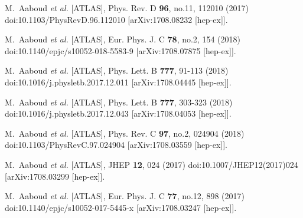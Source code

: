 \begin{thebibliography}{9}
M.~Aaboud \textit{et al.} [ATLAS],
Phys. Rev. D \textbf{96}, no.11, 112010 (2017)
doi:10.1103/PhysRevD.96.112010
[arXiv:1708.08232 [hep-ex]].

M.~Aaboud \textit{et al.} [ATLAS],
Eur. Phys. J. C \textbf{78}, no.2, 154 (2018)
doi:10.1140/epjc/s10052-018-5583-9
[arXiv:1708.07875 [hep-ex]].

M.~Aaboud \textit{et al.} [ATLAS],
Phys. Lett. B \textbf{777}, 91-113 (2018)
doi:10.1016/j.physletb.2017.12.011
[arXiv:1708.04445 [hep-ex]].

M.~Aaboud \textit{et al.} [ATLAS],
Phys. Lett. B \textbf{777}, 303-323 (2018)
doi:10.1016/j.physletb.2017.12.043
[arXiv:1708.04053 [hep-ex]].

M.~Aaboud \textit{et al.} [ATLAS],
Phys. Rev. C \textbf{97}, no.2, 024904 (2018)
doi:10.1103/PhysRevC.97.024904
[arXiv:1708.03559 [hep-ex]].

M.~Aaboud \textit{et al.} [ATLAS],
JHEP \textbf{12}, 024 (2017)
doi:10.1007/JHEP12(2017)024
[arXiv:1708.03299 [hep-ex]].

M.~Aaboud \textit{et al.} [ATLAS],
Eur. Phys. J. C \textbf{77}, no.12, 898 (2017)
doi:10.1140/epjc/s10052-017-5445-x
[arXiv:1708.03247 [hep-ex]].


\end{thebibliography}
